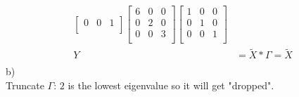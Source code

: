 \begin{flushleft}
\begin{align*}
\begin{bmatrix}
0 & 0 & 1 \\
\end{bmatrix}
\begin{bmatrix}
6 & 0 & 0 \\
0 & 2 & 0 \\
0 & 0 & 3 \\
\end{bmatrix}
\begin{bmatrix}
1 & 0 & 0 \\
0 & 1 & 0 \\
0 & 0 & 1 \\
\end{bmatrix}
\\
Y &= \widetilde{X} * \Gamma = \widetilde{X}
\\
\end{align*}
b)
\\
Truncate $\Gamma$: $2$ is the lowest eigenvalue so it will get "dropped". 
\\


\end{flushleft}
